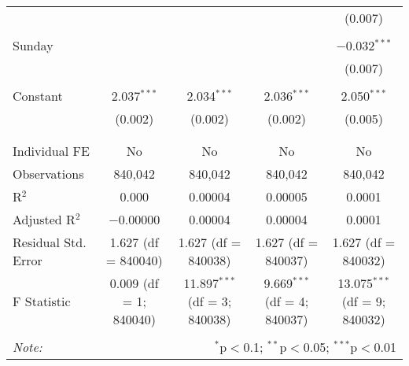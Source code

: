 \documentclass[
]{article}
\begin{document}
\begin{table}[!htbp]
{\begin{tabular}{@{\extracolsep{5pt}}lcccc}
  &  &  &  & (0.007) \\ 
  & & & & \\ 
 Sunday &  &  &  & $-$0.032$^{***}$ \\ 
  &  &  &  & (0.007) \\ 
  & & & & \\ 
 Constant & 2.037$^{***}$ & 2.034$^{***}$ & 2.036$^{***}$ & 2.050$^{***}$ \\ 
  & (0.002) & (0.002) & (0.002) & (0.005) \\ 
  & & & & \\ 
\hline \\[-1.8ex] 
Individual FE & No & No & No & No \\ 
Observations & 840,042 & 840,042 & 840,042 & 840,042 \\ 
R$^{2}$ & 0.000 & 0.00004 & 0.00005 & 0.0001 \\ 
Adjusted R$^{2}$ & $-$0.00000 & 0.00004 & 0.00004 & 0.0001 \\ 
Residual Std. Error & 1.627 (df = 840040) & 1.627 (df = 840038) & 1.627 (df = 840037) & 1.627 (df = 840032) \\ 
F Statistic & 0.009 (df = 1; 840040) & 11.897$^{***}$ (df = 3; 840038) & 9.669$^{***}$ (df = 4; 840037) & 13.075$^{***}$ (df = 9; 840032) \\ 
\hline 
\hline \\[-1.8ex] 
\textit{Note:}  & \multicolumn{4}{r}{$^{*}$p$<$0.1; $^{**}$p$<$0.05; $^{***}$p$<$0.01} \\ 
\end{tabular}
} 
\end{table} 
\newpage
\end{document}

